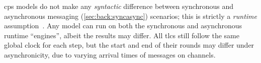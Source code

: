 



\gls{cps} models do not make any \emph{syntactic} difference between synchronous and asynchronous messaging (\cref{sec:back:syncasync}) scenarios;
this is strictly a \emph{runtime} assumption~\cite{Nicolescu2012}.
Any model can run on both the synchronous and asynchronous runtime ``engines'', albeit the results may differ.  All \glspl{tlc} still follow the same global clock for each step, but the start and end of their rounds may differ under asynchronicity, due to varying arrival times of messages on channels.

